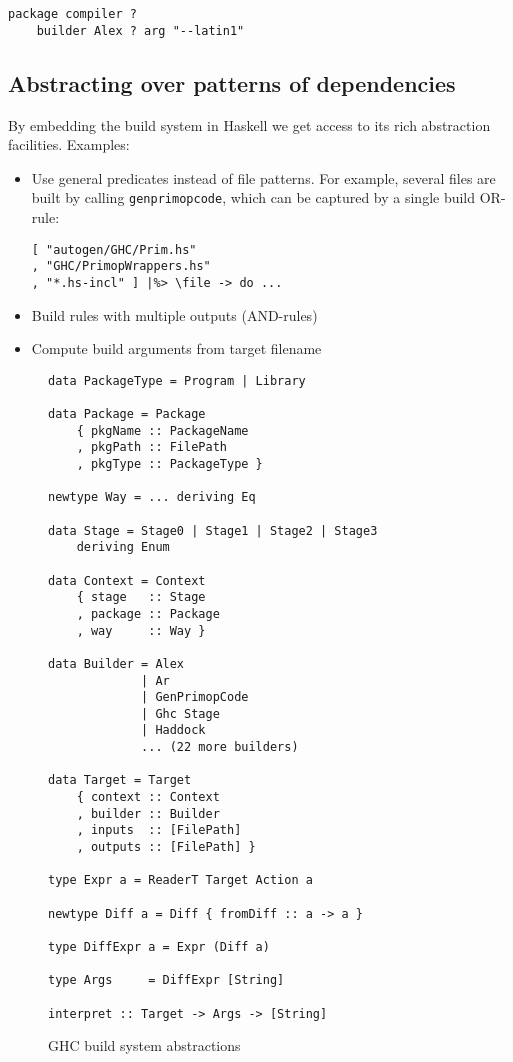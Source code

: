 \begin{verbatim}
package compiler ?
    builder Alex ? arg "--latin1"
\end{verbatim}

\subsection{Abstracting over patterns of dependencies}


By embedding the build system in Haskell we get access to its rich abstraction
facilities. Examples:
\begin{itemize}
  \item Use general predicates instead of file patterns. For example, several
  files are built by calling \texttt{genprimopcode}, which can be captured by a
  single build OR-rule:

\begin{lstlisting}[basicstyle=\ttfamily]
[ "autogen/GHC/Prim.hs"
, "GHC/PrimopWrappers.hs"
, "*.hs-incl" ] |%> \file -> do ...
\end{lstlisting}

  \item Build rules with multiple outputs (AND-rules)
  \item Compute build arguments from target filename
\end{itemize}

\begin{figure}
\begin{lstlisting}[basicstyle=\ttfamily]
data PackageType = Program | Library

data Package = Package
    { pkgName :: PackageName
    , pkgPath :: FilePath
    , pkgType :: PackageType }

newtype Way = ... deriving Eq

data Stage = Stage0 | Stage1 | Stage2 | Stage3
    deriving Enum

data Context = Context
    { stage   :: Stage
    , package :: Package
    , way     :: Way }

data Builder = Alex
             | Ar
             | GenPrimopCode
             | Ghc Stage
             | Haddock
             ... (22 more builders)

data Target = Target
    { context :: Context
    , builder :: Builder
    , inputs  :: [FilePath]
    , outputs :: [FilePath] }

type Expr a = ReaderT Target Action a

newtype Diff a = Diff { fromDiff :: a -> a }

type DiffExpr a = Expr (Diff a)

type Args     = DiffExpr [String]

interpret :: Target -> Args -> [String]
\end{lstlisting}
\caption{GHC build system abstractions\label{fig:abstractions}}
\end{figure}

